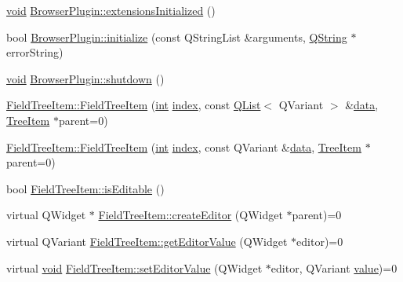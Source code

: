 \begin{DoxyCompactItemize}
\item 
\hyperlink{group___u_a_v_objects_plugin_ga444cf2ff3f0ecbe028adce838d373f5c}{void} \hyperlink{group___u_a_v_object_browser_plugin_gabd7f5c6dac73c173cebd4e59dbc99182}{Browser\-Plugin\-::extensions\-Initialized} ()
\item 
bool \hyperlink{group___u_a_v_object_browser_plugin_gac452314c7c28ab0c1fb1bb935bed5d0d}{Browser\-Plugin\-::initialize} (const Q\-String\-List \&arguments, \hyperlink{group___u_a_v_objects_plugin_gab9d252f49c333c94a72f97ce3105a32d}{Q\-String} $\ast$error\-String)
\item 
\hyperlink{group___u_a_v_objects_plugin_ga444cf2ff3f0ecbe028adce838d373f5c}{void} \hyperlink{group___u_a_v_object_browser_plugin_ga8d7b6113315a8625ce56679504594fa3}{Browser\-Plugin\-::shutdown} ()
\item 
\hyperlink{group___u_a_v_object_browser_plugin_ga9ada7d4ed9c60eb20abec8cfc8e99960}{Field\-Tree\-Item\-::\-Field\-Tree\-Item} (\hyperlink{ioapi_8h_a787fa3cf048117ba7123753c1e74fcd6}{int} \hyperlink{glext_8h_ab47dd9958bcadea08866b42bf358e95e}{index}, const \hyperlink{class_q_list}{Q\-List}$<$ Q\-Variant $>$ \&\hyperlink{glext_8h_a8850df0785e6fbcc2351af3b686b8c7a}{data}, \hyperlink{class_tree_item}{Tree\-Item} $\ast$parent=0)
\item 
\hyperlink{group___u_a_v_object_browser_plugin_gab23936d93e6b5a9121347243b8121ddb}{Field\-Tree\-Item\-::\-Field\-Tree\-Item} (\hyperlink{ioapi_8h_a787fa3cf048117ba7123753c1e74fcd6}{int} \hyperlink{glext_8h_ab47dd9958bcadea08866b42bf358e95e}{index}, const Q\-Variant \&\hyperlink{glext_8h_a8850df0785e6fbcc2351af3b686b8c7a}{data}, \hyperlink{class_tree_item}{Tree\-Item} $\ast$parent=0)
\item 
bool \hyperlink{group___u_a_v_object_browser_plugin_ga9451c80f28fd4e9cf1039ccd6c5a578f}{Field\-Tree\-Item\-::is\-Editable} ()
\item 
virtual Q\-Widget $\ast$ \hyperlink{group___u_a_v_object_browser_plugin_ga06084172e5bbdc94cbe4af05faa1402a}{Field\-Tree\-Item\-::create\-Editor} (Q\-Widget $\ast$parent)=0
\item 
virtual Q\-Variant \hyperlink{group___u_a_v_object_browser_plugin_ga1807c283f6304e53fc9d655e087ef1c0}{Field\-Tree\-Item\-::get\-Editor\-Value} (Q\-Widget $\ast$editor)=0
\item 
virtual \hyperlink{group___u_a_v_objects_plugin_ga444cf2ff3f0ecbe028adce838d373f5c}{void} \hyperlink{group___u_a_v_object_browser_plugin_gaaa08b0cb3b19768b9dad7281248ce90b}{Field\-Tree\-Item\-::set\-Editor\-Value} (Q\-Widget $\ast$editor, Q\-Variant \hyperlink{glext_8h_aa0e2e9cea7f208d28acda0480144beb0}{value})=0

\end{DoxyCompactItemize}
